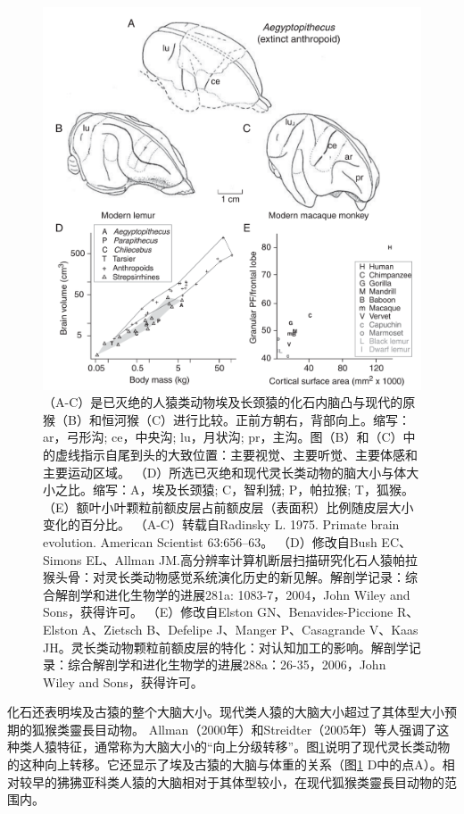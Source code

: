 \begin{figure}[!htb]
	\centering
	\includegraphics[width=0.8\linewidth]{image_pfc/Fig_2_7}
	\caption*{（A-C）是已灭绝的人猿类动物埃及长颈猿的化石内脑凸与现代的原猴（B）和恒河猴（C）进行比较。正前方朝右，背部向上。缩写：ar，弓形沟; ce，中央沟; lu，月状沟; pr，主沟。图（B）和（C）中的虚线指示自尾到头的大致位置：主要视觉、主要听觉、主要体感和主要运动区域。 （D）所选已灭绝和现代灵长类动物的脑大小与体大小之比。缩写：A，埃及长颈猿; C，智利狨; P，帕拉猴; T，狐猴。 （E）额叶小叶颗粒前额皮层占前额皮层（表面积）比例随皮层大小变化的百分比。 （A-C）转载自Radinsky L. 1975. Primate brain evolution. American Scientist 63:656–63。 （D）修改自Bush EC、Simons EL、Allman JM.高分辨率计算机断层扫描研究化石人猿帕拉猴头骨：对灵长类动物感觉系统演化历史的新见解。解剖学记录：综合解剖学和进化生物学的进展281a: 1083-7，2004，John Wiley and Sons，获得许可。 （E）修改自Elston GN、Benavides-Piccione R、Elston A、Zietsch B、Defelipe J、Manger P、Casagrande V、Kaas JH。灵长类动物颗粒前额皮层的特化：对认知加工的影响。解剖学记录：综合解剖学和进化生物学的进展288a：26-35，2006，John Wiley and Sons，获得许可。\label{fig:fig_2_7}}
\end{figure}


化石还表明埃及古猿的整个大脑大小。现代类人猿的大脑大小超过了其体型大小预期的狐猴类靈長目动物。 Allman（2000年）和Streidter（2005年）等人强调了这种类人猿特征，通常称为大脑大小的“向上分级转移”。图\ref{fig:fig_2_7}说明了现代灵长类动物的这种向上转移。它还显示了埃及古猿的大脑与体重的关系（图\ref{fig:fig_2_7} D中的点A）。相对较早的狒狒亚科类人猿的大脑相对于其体型较小，在现代狐猴类靈長目动物的范围内。

